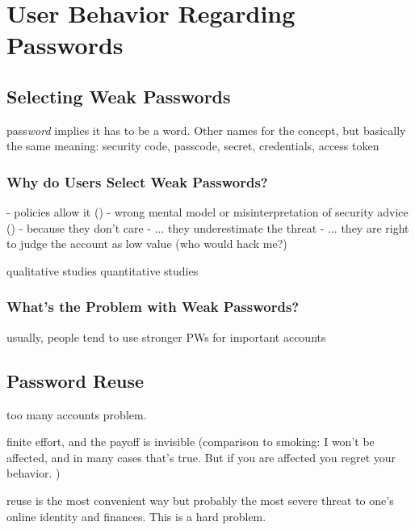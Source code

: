 	
\section{User Behavior Regarding Passwords}
\label{sec:rw:how-users-cope}



	\subsection{Selecting Weak Passwords}

	pass\textit{word} implies it has to be a word. Other names for the concept, but basically the same meaning: security code, passcode, secret, credentials, access token
	

		\subsubsection{Why do Users Select Weak Passwords?}
	
	- policies allow it (\cite{Seitz2017PoliciesReuse})
	- wrong mental model or misinterpretation of security advice (\cite{Ur2015PWCreationLab, Ur2016PerceptionsPassword, Seitz2017PASDJO})
	- because they don't care
	- ... they underestimate the threat
	- ... they are right to judge the account as low value (who would hack me?) \cite{LastPass2016PersonalitiesGetUsHacked}
	
	
	qualitative studies \cite{Ur2015PWCreationLab, Stobert2014PasswordLifeCycle} 
	quantitative studies \cite{Ur2016PerceptionsPassword, Seitz2017PASDJO}
	
	\subsubsection{What's the Problem with Weak Passwords?}
	usually, people tend to use stronger PWs for important accounts

	


	\subsection{Password Reuse}
	too many accounts problem. 
	
	finite effort, and the payoff is invisible (comparison to smoking: I won't be affected, and in many cases that's true. But if you are affected you regret your behavior. )
	
	reuse is the most convenient way but probably the most severe threat to one's online identity and finances. This is a hard problem. 
	
